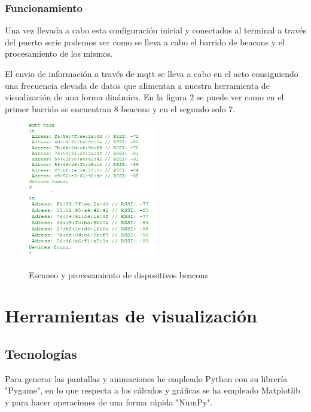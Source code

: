 \documentclass[paper=a4, fontsize=11pt,twoside]{scrartcl}
\begin{document}
        \subsubsection{Funcionamiento}
            Una vez llevada a cabo esta configuración inicial y conectados al terminal a través del puerto serie podemos ver como se lleva a cabo el barrido 
            de beacons y el procesamiento de los mismos.

            El envio de información a través de mqtt se lleva a cabo en el acto consiguiendo una frecuencia elevada de datos que alimentan a nuestra herramienta 
            de visualización de una forma dinámica. En la figura 2 se puede ver como en el primer barrido se encuentran 8 beacons y en el segundo solo 7.
            \begin{center}
                \begin{figure}[]
                    \centering
                    \includegraphics[width=0.5\textwidth]{../../Memmory/images/s_scanning_1.PNG}
                    \includegraphics[width=0.5\textwidth]{../../Memmory/images/s_scanning_2.PNG}
                    \caption{Escaneo y procesamiento de dispositivos beacons}
                    \label{fig:mesh13}
                \end{figure}
            \end{center}
\section{Herramientas de visualización}
    \subsection{Tecnologías}
        Para generar las pantallas y animaciones he empleado Python con su librería "Pygame", en lo que respecta a los cálculos 
        y gráficas se ha empleado Matplotlib y para hacer operaciones de una forma rápida "NumPy".    
\end{document}
